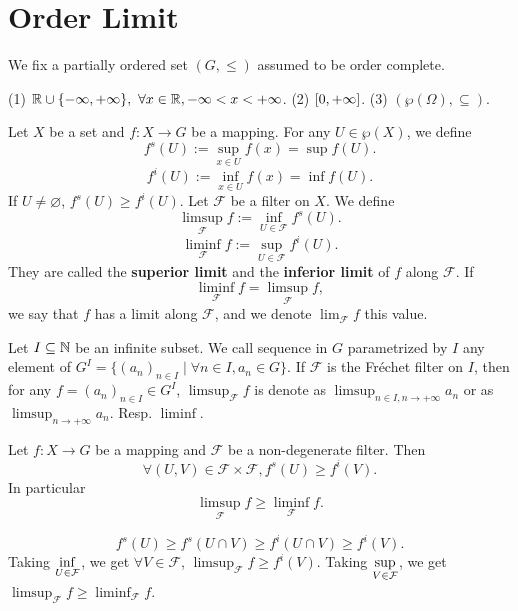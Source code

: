 \section{Order Limit}
We fix a partially ordered set $(G,\le)$ assumed to be order complete.
\begin{exampleenv}
    \quad
    \newline
    (1) $\mathbb{R}\cup\{-\infty,+\infty\}, \ \forall x\in \mathbb{R}, -\infty<x<+\infty$.
    \newline
    (2) $\interval{0}{+\infty}$.
    \newline
    (3) $\left(\wp(\Omega),\subseteq\right)$.
\end{exampleenv}
\begin{definitionenv}
    Let $X$ be a set and $f:X\longrightarrow G$ be a mapping. For any $U\in \wp(X)$, we define 
    $$f^s(U):=\sup_{x\in U}f(x)=\sup f(U).$$
    $$f^i(U):=\inf_{x\in U}f(x)=\inf f(U).$$
    If $U\not=\varnothing$, $f^s(U)\ge f^i(U)$. Let $\mathcal{F}$ be a filter on $X$. We define 
    $$\limsup_\mathcal{F} f:=\inf_{U\in \mathcal{F}} f^s(U).$$
    $$\liminf_\mathcal{F} f:=\sup_{U\in \mathcal{F}} f^i(U).$$
    They are called the \textbf{superior limit} and the \textbf{inferior limit} of $f$ along $\mathcal{F}$. If 
    $$\liminf_\mathcal{F} f=\limsup_\mathcal{F} f,$$
    we say that $f$ has a limit along $\mathcal{F}$, and we denote $\displaystyle \lim_{\mathcal{F}}f$ this value.
\end{definitionenv}
\begin{notationenv}
    Let $I\subseteq \mathbb{N}$ be an infinite subset. We call sequence in $G$ parametrized by $I$ any element of $G^I=\{(a_n)_{n\in I}\mid \forall n\in I,a_n\in G\}$. If $\mathcal{F}$ is the Fréchet filter on $I$, then for any $f=(a_n)_{n\in I}\in G^I$, $\limsup_{\mathcal{F}}f$ is denote as $\displaystyle\limsup_{n\in I, n\rightarrow+\infty}a_n$ or as $\displaystyle\limsup_{n\rightarrow +\infty}a_n$. Resp. $\liminf$.
\end{notationenv}
\begin{propositionenv}
    Let $f:X\longrightarrow G$ be a mapping and $\mathcal{F}$ be a non-degenerate filter. Then 
    $$\forall (U,V)\in \mathcal{F}\times\mathcal{F}, f^{s}(U)\ge f^i(V).$$
    In particular 
    $$\limsup_\mathcal{F}f\ge \liminf_\mathcal{F}f.$$
\end{propositionenv}
\begin{proofenv}
    $$f^s(U)\ge f^s(U\cap V)\ge f^i(U\cap V)\ge f^i(V).$$
    Taking $\displaystyle\inf_{U\in \mathcal{F}}$, we get $\forall V\in \mathcal{F}$, $\limsup_{\mathcal{F}}f\ge f^i(V)$. Taking $\displaystyle\sup_{V\in \mathcal{F}}$, we get $\limsup_{\mathcal{F}}f\ge \liminf_{\mathcal{F}}f$.
\end{proofenv}
